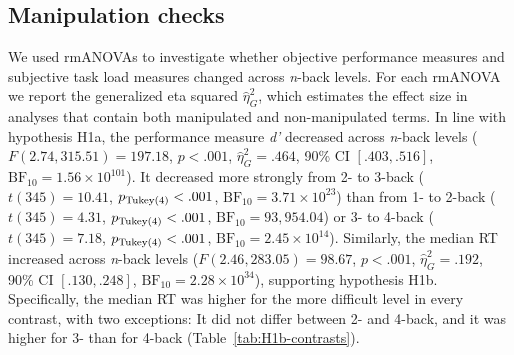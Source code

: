\documentclass[
  man,floatsintext]{apa6}
\begin{document}
\hypertarget{manipulation-checks}{%
\subsection{Manipulation checks}\label{manipulation-checks}}

We used rmANOVAs to investigate whether objective performance measures and subjective task load measures changed across \emph{n}-back levels.
For each rmANOVA we report the generalized eta squared \(\hat{\eta}^2_G\), which estimates the effect size in analyses that contain both manipulated and non-manipulated terms.
In line with hypothesis H1a, the performance measure \emph{d'} decreased across \emph{n}-back levels (\(F(2.74, 315.51) = 197.18\), \(p < .001\), \(\hat{\eta}^2_G = .464\), 90\% CI \([.403, .516]\), \(\mathrm{BF}_{\textrm{10}} = 1.56 \times 10^{101}\)).
It decreased more strongly from 2- to 3-back (\(t(345) = 10.41\), \(p_\mathrm{\scriptsize Tukey(4)} < .001\), \(\mathrm{BF}_{\textrm{10}} = 3.71 \times 10^{23}\)) than from 1- to 2-back (\(t(345) = 4.31\), \(p_\mathrm{\scriptsize Tukey(4)} < .001\), \(\mathrm{BF}_{\textrm{10}} = 93,954.04\)) or 3- to 4-back (\(t(345) = 7.18\), \(p_\mathrm{\scriptsize Tukey(4)} < .001\), \(\mathrm{BF}_{\textrm{10}} = 2.45 \times 10^{14}\)).
Similarly, the median RT increased across \emph{n}-back levels (\(F(2.46, 283.05) = 98.67\), \(p < .001\), \(\hat{\eta}^2_G = .192\), 90\% CI \([.130, .248]\), \(\mathrm{BF}_{\textrm{10}} = 2.28 \times 10^{34}\)), supporting hypothesis H1b.
Specifically, the median RT was higher for the more difficult level in every contrast, with two exceptions:
It did not differ between 2- and 4-back, and it was higher for 3- than for 4-back (Table~\ref{tab:H1b-contrasts}).
\end{document}
